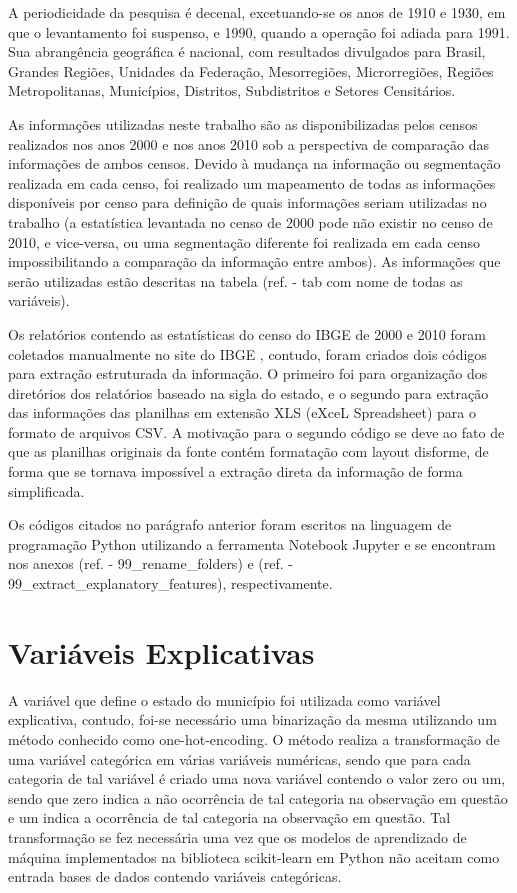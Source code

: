 A periodicidade da pesquisa é decenal, excetuando-se os anos de 1910 e 1930, em que o levantamento foi suspenso, e 1990, quando a operação foi adiada para 1991. Sua abrangência geográfica é nacional, com resultados divulgados para Brasil, Grandes Regiões, Unidades da Federação, Mesorregiões, Microrregiões, Regiões Metropolitanas, Municípios, Distritos, Subdistritos e Setores Censitários.

As informações utilizadas neste trabalho são as disponibilizadas pelos censos realizados nos anos 2000 e nos anos 2010 sob a perspectiva de comparação das informações de ambos censos. Devido à mudança na informação ou segmentação realizada em cada censo, foi realizado um mapeamento de todas as informações disponíveis por censo para definição de quais informações seriam utilizadas no trabalho (a estatística levantada no censo de 2000 pode não existir no censo de 2010, e vice-versa, ou uma segmentação diferente foi realizada em cada censo impossibilitando a comparação da informação entre ambos). As informações que serão utilizadas estão descritas na tabela (ref. - tab com nome de todas as variáveis).

Os relatórios contendo as estatísticas do censo do IBGE de 2000 e 2010 foram coletados manualmente no site do IBGE \cite{IBGE}, contudo, foram criados dois códigos para extração estruturada da informação. O primeiro foi para organização dos diretórios dos relatórios baseado na sigla do estado, e o segundo para extração das informações das planilhas em extensão XLS (eXceL Spreadsheet) para o formato de arquivos CSV. A motivação para o segundo código se deve ao fato de que as planilhas originais da fonte contém formatação com layout disforme, de forma que se tornava impossível a extração direta da informação de forma simplificada.

Os códigos citados no parágrafo anterior foram escritos na linguagem de programação Python utilizando a ferramenta Notebook Jupyter e se encontram nos anexos (ref. - 99_rename_folders) e (ref. - 99_extract_explanatory_features), respectivamente.

\section{Variáveis Explicativas}
\label{sec:variaveis_explicativas}

A variável que define o estado do município foi utilizada como variável explicativa, contudo, foi-se necessário uma binarização da mesma utilizando um método conhecido como one-hot-encoding. O método realiza a transformação de uma variável categórica em várias variáveis numéricas, sendo que para cada categoria de tal variável é criado uma nova variável contendo o valor zero ou um, sendo que zero indica a não ocorrência de tal categoria na observação em questão e um indica a ocorrência de tal categoria na observação em questão. Tal transformação se fez necessária uma vez que os modelos de aprendizado de máquina implementados na biblioteca scikit-learn em Python não aceitam como entrada bases de dados contendo variáveis categóricas.

